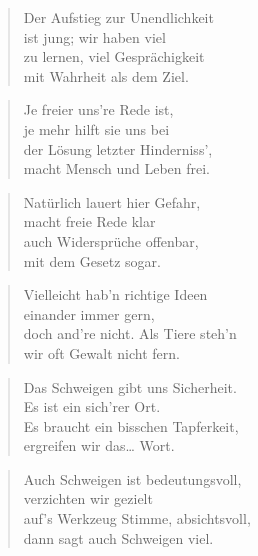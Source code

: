 \documentclass[10pt,a4paper]{article}
\begin{document}
\begin{paracol}{2}
\begin{verse}
Der Aufstieg zur Unendlichkeit \\
ist jung; wir haben viel \\
zu lernen, viel Gesprächigkeit \\
mit Wahrheit als dem Ziel. \\
\end{verse}

\begin{verse}
Je freier uns’re Rede ist, \\
je mehr hilft sie uns bei \\
der Lösung letzter Hinderniss’, \\
macht Mensch und Leben frei. \\
\end{verse}

\begin{verse}
Natürlich lauert hier Gefahr, \\
macht freie Rede klar \\
auch Widersprüche offenbar, \\
mit dem Gesetz sogar. \\
\end{verse}

\begin{verse}
Vielleicht hab’n richtige Ideen \\
einander immer gern, \\
doch and’re nicht. Als Tiere steh’n \\
wir oft Gewalt nicht fern. \\
\end{verse}

\begin{verse}
Das Schweigen gibt uns Sicherheit. \\
Es ist ein sich’rer Ort. \\
Es braucht ein bisschen Tapferkeit, \\
ergreifen wir das… Wort. \\
\end{verse}

\begin{verse}
Auch Schweigen ist bedeutungsvoll, \\
verzichten wir gezielt \\
auf’s Werkzeug Stimme, absichtsvoll, \\
dann sagt auch Schweigen viel. \\
\end{verse}


\end{paracol}
\end{document}
